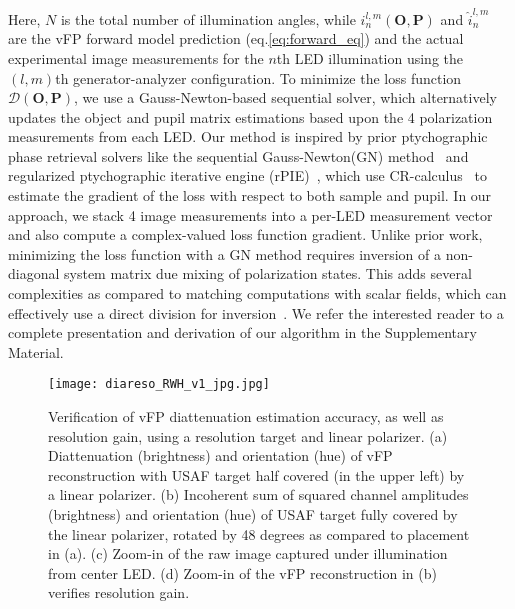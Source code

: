 \documentclass{article}
\providecommand{\mP}{\mathbf{P}}
\providecommand{\mO}{\mathbf{O}}
\begin{document}
Here, $N$ is the total number of illumination angles, while ${i}_n^{l,m}\left(\mathbf{O},\mathbf{P}\right)$ and $\hat{i}_n^{l,m}$ are the vFP forward model prediction (eq.\ref{eq:forward_eq}) and the actual experimental image measurements for the $n$th LED illumination using the $(l,m)$th generator-analyzer configuration. To minimize the loss function $\mathcal{D}(\mO,\mP)$, we use a Gauss-Newton-based sequential solver, which alternatively updates the object and pupil matrix estimations based upon the 4 polarization measurements from each LED. Our method is inspired by prior ptychographic phase retrieval solvers like the sequential Gauss-Newton(GN) method~\cite{tian2014multiplexed} and regularized ptychographic iterative engine (rPIE)~\cite{maiden2017further}, which use CR-calculus~\cite{kreutz2009complex} to estimate the gradient of the loss with respect to both sample and pupil. In our approach, we stack 4 image measurements into a per-LED measurement vector and also compute a complex-valued loss function gradient. Unlike prior work, minimizing the loss function with a GN method requires inversion of a non-diagonal system matrix due mixing of polarization states. This adds several complexities as compared to matching computations with scalar fields, which can effectively use a direct division for inversion~\cite{tian2014multiplexed,maiden2017further}. We refer the interested reader to a complete presentation and derivation of our algorithm in the Supplementary Material.

\begin{figure}[t!]
\begin{center}
    \texttt{[image: diareso\_RWH\_v1\_jpg.jpg]}
    \caption{Verification of vFP diattenuation estimation accuracy, as well as resolution gain, using a resolution target and linear polarizer. (a) Diattenuation (brightness) and orientation (hue) of vFP reconstruction with USAF target half covered (in the upper left) by a linear polarizer. (b) Incoherent sum of squared channel amplitudes (brightness) and orientation (hue) of USAF target fully covered by the linear polarizer, rotated by 48 degrees as compared to placement in (a). (c) Zoom-in of the raw image captured under illumination from center LED. (d) Zoom-in of the vFP reconstruction in (b) verifies resolution gain.}
    \label{Fig.2}
\end{center}
\end{figure}
\end{document}
